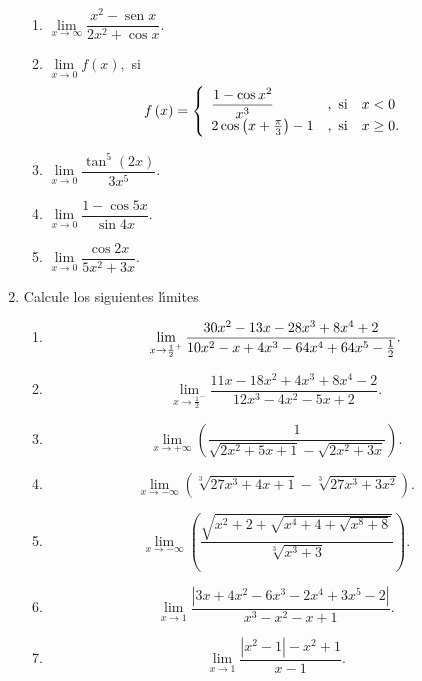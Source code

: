 \begin{enumerate}
\begin{enumerate}
\item $\lim\limits_{x\rightarrow\infty}\dfrac{x^{2}-\operatorname{sen}%
x}{2x^{2}+\cos x}.$

\item $\lim\limits_{x\rightarrow0}f\left(  x\right)  ,$ si
\[
f\left(  x\right)  =\left\{
\begin{array}
[c]{lll}%
\dfrac{1-\cos x^{2}}{x^{3}} & ,\text{ si} & x<0\\
2\cos\left(  x+\frac{\pi}{3}\right)  -1 & ,\text{ si} & x\geq0.
\end{array}
\right.
\]


\item $\lim\limits_{x\rightarrow0}\dfrac{\tan^{5}\left(  2x\right)  }{3x^{5}%
}.$

\item $\lim\limits_{x\rightarrow0}\dfrac{1-\cos5x}{\sin4x}.$

\item $\lim\limits_{x\rightarrow0}\dfrac{\cos2x}{5x^{2}+3x}.$
\end{enumerate}

\item Calcule los siguientes l\'{\i}mites

\begin{enumerate}
\item
\[
\lim\limits_{x\rightarrow\frac{1}{2}^{+}}\frac{\allowbreak30x^{2}%
-13x-28x^{3}+8x^{4}+2}{\allowbreak10x^{2}-x+4x^{3}-64x^{4}+64x^{5}-\frac{1}%
{2}}.
\]


\item
\[
\lim\limits_{x\rightarrow\frac{1}{2}^{-}}\frac{11x-18x^{2}+4x^{3}+8x^{4}%
-2}{12x^{3}-4x^{2}-5x+2}.
\]


\item
\[
\lim\limits_{x\rightarrow+\infty}\left(  \frac{1}{\sqrt{2x^{2}+5x+1}%
-\sqrt{2x^{2}+3x}}\right)  .
\]


\item
\[
\lim\limits_{x\rightarrow-\infty}\left(  \sqrt[3]{27x^{3}+4x+1}-\sqrt[3]%
{27x^{3}+3x^{2}}\right)  .
\]


\item
\[
\lim\limits_{x\rightarrow-\infty}\left(  \frac{\sqrt{x^{2}+2+\sqrt
{x^{4}+4+\sqrt{x^{8}+8}}}}{\sqrt[3]{x^{3}+3}}\right)  .
\]


\item
\[
\lim\limits_{x\rightarrow1}\frac{\left\vert 3x+4x^{2}-6x^{3}-2x^{4}%
+3x^{5}-2\right\vert }{x^{3}-x^{2}-x+1}.
\]


\item
\[
\lim\limits_{x\rightarrow1}\frac{\left\vert x^{2}-1\right\vert -x^{2}+1}%
{x-1}.
\]


\end{enumerate}
\end{enumerate}
